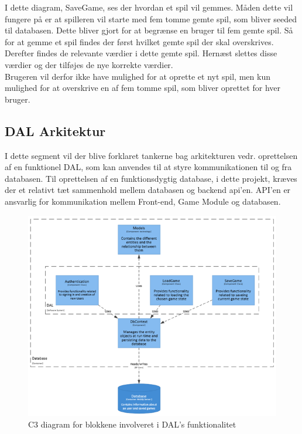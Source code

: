I dette diagram, SaveGame, ses der hvordan et spil vil gemmes. Måden dette vil fungere på er at spilleren vil starte med fem tomme gemte spil, som bliver seeded til databasen. Dette bliver gjort for at begrænse en bruger til fem gemte spil. Så for at gemme et spil findes der først hvilket gemte spil der skal overskrives. Derefter findes de relevante værdier i dette gemte spil. Hernæst slettes disse værdier og der tilføjes de nye korrekte værdier.\\
Brugeren vil derfor ikke have mulighed for at oprette et nyt spil, men kun mulighed for at overskrive en af fem tomme spil, som bliver oprettet for hver bruger.



\subsection{DAL Arkitektur}
I dette segment vil der blive forklaret tankerne bag arkitekturen vedr. oprettelsen af en funktionel DAL, som kan anvendes til at styre kommunikationen til og fra databasen.
Til oprettelsen af en funktionsdygtig database, i dette projekt, kræves der et relativt tæt sammenhold mellem databasen og backend api’en. API’en er ansvarlig for kommunikation mellem Front-end, Game Module og databasen.

\begin{figure}[H]
\centering
\includegraphics[width = \textwidth]{02-Body/Images/DALArkitektur}
\caption{C3 diagram for blokkene involveret i DAL's funktionalitet}

\label{fig:DALArkitektur}
\end{figure}



